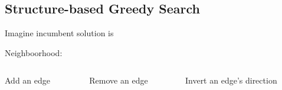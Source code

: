 \subsection{Structure-based Greedy Search}
	\begin{frame}[fragile]
		Imagine incumbent solution is
		\begin{figure}
			\centering
			
		\end{figure}
		Neighboorhood:
		\begin{columns}
			\begin{column}{.3\textwidth}
				\begin{figure}
					\centering
					
				\end{figure}
				\centering
				Add an edge
			\end{column}
			\begin{column}{.3\textwidth}
				\begin{figure}
					\centering
					
				\end{figure}
				\centering
				Remove an edge
			\end{column}
			\begin{column}{.3\textwidth}
				\begin{figure}
					\centering
					
				\end{figure}
				\centering
				Invert an edge's direction
			\end{column}
		\end{columns}
	\end{frame}